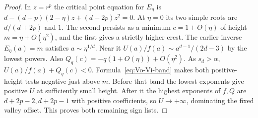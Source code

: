 \begin{proof}
In $z=r^p$ the critical point equation for $E_\eta$ is
$d-(d+p)(2-\eta)z+(d+2p)z^2=0$. At $\eta=0$ its two simple roots
are $d/(d+2p)$ and $1$. The second persists as a minimum $c=1+O(\eta)$
of height $m=\eta+O(\eta^2)$, and the first gives a strictly higher
crest. The earlier inverse $E_\eta(a)=m$ satisfies $a\sim\eta^{1/d}$.
Near it $U(a)/f(a)\sim a^{d-1}/(2d-3)$ by the lowest powers.
Also $Q_q(c)=-q(1+O(\eta))+O(\eta^2)$. As $s_d>\alpha$,
$U(a)/f(a)+Q_q(c)<0$. Formula~\eqref{eq:Vo-Vi-band} makes both
positive-height tests negative just above $m$. Before that band the
lowest exponents give positive $U$ at sufficiently small height.
After it the highest exponents of $f,Q$ are $d+2p-2,d+2p-1$
with positive coefficients, so $U\to+\infty$, dominating the fixed
valley offset. This proves both remaining sign lists.
\end{proof}

